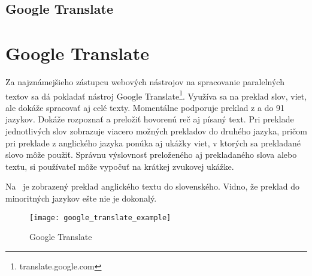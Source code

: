 %
%
{
	\subsection{Google Translate}
}
{
	\section{Google Translate}
}
Za najznámejšieho zástupcu webových nástrojov na spracovanie paralelných textov sa dá pokladať nástroj Google Translate\footnote{translate.google.com}. Využíva sa na preklad slov, viet, ale dokáže spracovať aj celé texty. Momentálne podporuje preklad z a do 91 jazykov. Dokáže rozpoznať a preložiť hovorenú reč aj písaný text. Pri preklade jednotlivých slov zobrazuje viacero možných prekladov do druhého jazyka, pričom pri preklade z anglického jazyka ponúka aj ukážky viet, v ktorých sa prekladané slovo môže použiť. Správnu výslovnosť preloženého aj prekladaného slova alebo textu, si používateľ môže vypočuť na krátkej zvukovej ukážke.

Na~ je zobrazený preklad anglického textu do slovenského. Vidno, že preklad do minoritných jazykov ešte nie je dokonalý.

\begin{figure}[H]
	\begin{center}\texttt{[image: google\_translate\_example]}\end{center}
	\caption[Google Translate]{Google Translate}\label{fig:google_translate_example}
\end{figure}

